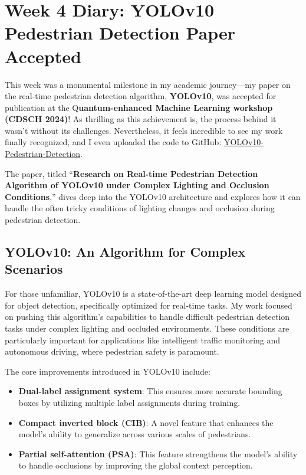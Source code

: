 \documentclass[a4paper]{article} 	%
\begin{document}
\section{Week 4 Diary: YOLOv10 Pedestrian Detection Paper Accepted}

This week was a monumental milestone in my academic journey—my paper on the real-time pedestrian detection algorithm,\textbf{ YOLOv10}, was accepted for publication at the Q\textbf{uantum-enhanced Machine Learning workshop (CDSCH 2024)}! As thrilling as this achievement is, the process behind it wasn’t without its challenges. Nevertheless, it feels incredible to see my work finally recognized, and I even uploaded the code to GitHub: \href{https://github.com/weyumm/YOLOv10-Pedestrian-Detection}{YOLOv10-Pedestrian-Detection}. 

The paper, titled “\textbf{Research on Real-time Pedestrian Detection Algorithm of YOLOv10 under Complex Lighting and Occlusion Conditions},” dives deep into the YOLOv10 architecture and explores how it can handle the often tricky conditions of lighting changes and occlusion during pedestrian detection. 

\subsection*{YOLOv10: An Algorithm for Complex Scenarios}

For those unfamiliar, YOLOv10 is a state-of-the-art deep learning model designed for object detection, specifically optimized for real-time tasks. My work focused on pushing this algorithm’s capabilities to handle difficult pedestrian detection tasks under complex lighting and occluded environments. These conditions are particularly important for applications like intelligent traffic monitoring and autonomous driving, where pedestrian safety is paramount.

The core improvements introduced in YOLOv10 include:
\begin{itemize}
	\item \textbf{Dual-label assignment system}: This ensures more accurate bounding boxes by utilizing multiple label assignments during training.
	\item \textbf{Compact inverted block (CIB)}: A novel feature that enhances the model’s ability to generalize across various scales of pedestrians.
	\item \textbf{Partial self-attention (PSA)}: This feature strengthens the model’s ability to handle occlusions by improving the global context perception.
\end{itemize}
\end{document}
